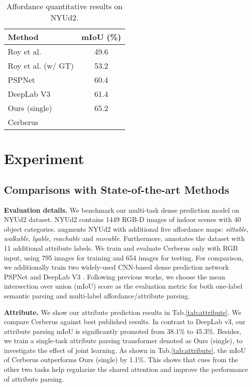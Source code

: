 \documentclass[10pt,twocolumn,letterpaper]{article}
\begin{document}
\begin{table}
	\centering
	\begin{tabular}{@{}lc@{}}
		\toprule
		\textbf{Method} & \textbf{mIoU (\%)} \\
		\midrule
		Roy et al. \cite{roy2016multi} & 49.6 \\
		Roy et al.  (w/ GT) \cite{roy2016multi} & 53.2 \\
		PSPNet \cite{zhao2017pyramid} & 60.4  \\
		DeepLab V3 \cite{chen2017rethinking} & 61.4  \\
		\midrule
		Ours (single) & {65.2} \\
		Cerberus &  \\
		\bottomrule
	\end{tabular}
	\caption{Affordance quantitative results on NYUd2.}
	\label{tab:affordance}
\end{table}

\section{Experiment}

\subsection{Comparisons with State-of-the-art Methods}
\textbf{Evaluation details.} We benchmark our multi-task dense prediction model on NYUd2\cite{silberman2012indoor} dataset. NYUd2 contains 1449 RGB-D images of indoor scenes with 40 object categories. \cite{roy2016multi} augments NYUd2 with additional five affordance maps: \emph{sittable}, \emph{walkable}, \emph{lyable}, \emph{reachable} and \emph{movable}. Furthermore, \cite{zheng2014dense} annotates the dataset with 11 additional attribute labels. We train and evaluate Cerberus only with RGB input, using 795 images for training and 654 images for testing. For comparison, we additionally train two widely-used CNN-based dense prediction network PSPNet\cite{zhao2017pyramid} and DeepLab V3 \cite{chen2017rethinking}. Following previous works, we choose the mean intersection over union (mIoU) score as the evaluation metric for both one-label semantic parsing and multi-label affordance/attribute parsing.  

\textbf{Attribute.}
We show our attribute prediction results in Tab.\ref{tab:attribute}. We compare Cerberus against best published results. In contrast to DeepLab v3, our attribute parsing mIoU is significantly  promoted  from 38.1\% to  45.3\%. Besides, we train a single-task attribute parsing transformer denoted as Ours (single), to investigate the effect of joint learning. As shown in Tab.\ref{tab:attribute}, the mIoU of Cerberus outperforms Ours (single) by 1.1\%. This shows that cues from the other two tasks help regularize the shared attention and improve the performance of attribute parsing. 
\end{document}
